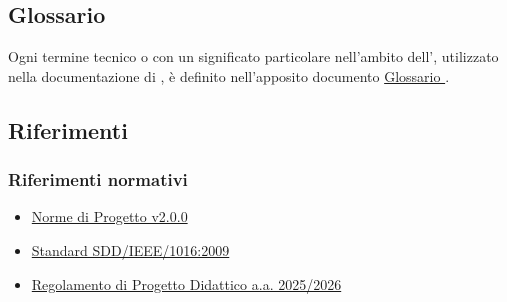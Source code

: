 \subsection{Glossario}
Ogni termine tecnico o con un significato particolare nell’ambito
dell’, utilizzato nella documentazione di , è
definito nell’apposito documento
\href{https://7-zpus.github.io/Docs/assets/3_PB/DocumentiInterni/Glossario.pdf}{Glossario
}.

\subsection{Riferimenti}

\subsubsection{Riferimenti normativi}
\begin{itemize}
    \item \href{https://github.com/7-ZPUs/Docs/blob/main/3_PB/DocumentiInterni/NormeDiProgetto.pdf}{Norme di Progetto v2.0.0 }
    \item \href{https://en.wikipedia.org/wiki/Software_design_description}{Standard SDD/IEEE/1016:2009}
    \item \href{https://www.math.unipd.it/~tullio/IS-1/2025/Dispense/PD1.pdf}{Regolamento di Progetto Didattico a.a.
              2025/2026} 
\end{itemize}

